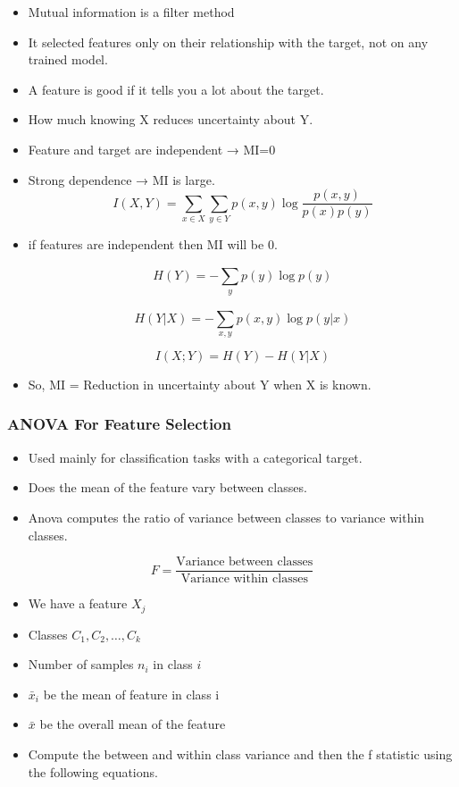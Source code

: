 \documentclass[10pt,a4paper]{article}
\begin{document}
	\begin{itemize}
		\item Mutual information is a filter method
		\item It selected features only on their relationship with the target, not on any trained model.
		\item A feature is good if it tells you a lot about the target.
		\item How much knowing X reduces uncertainty about Y.
		\item Feature and target are independent → MI=0
		\item Strong dependence → MI is large.
		\[
		I(X,Y) = \sum_{x \in X}^{} \sum_{y \in Y}^{} p(x,y) \log \frac{p(x,y)}{p(x)p(y)}
		\]
	
		\item if features are independent then MI will be 0.
		
		\[
		H(Y) = - \sum_{y}^{} p(y) \log p(y)
		\]

		\[
		H(Y|X) = - \sum_{x,y}^{} p(x,y) \log p(y|x)
		\]
		
		\[
		I(X;Y) = H(Y) - H(Y|X)
		\]

		\item So, MI = Reduction in uncertainty about Y when X is known.
	\end{itemize}
	
	\subsubsection{ANOVA For Feature Selection}
	\begin{itemize}
		\item Used mainly for classification tasks with a categorical target.
		\item Does the mean of the feature vary between classes.
		\item Anova computes the ratio of variance between classes to variance within classes.
	\end{itemize}

	$$	F = \frac{\text{Variance between classes}}{\text{Variance within classes}}
	$$
	\begin{itemize}
		\item We have a feature $X_j$
		\item Classes $C_1, C_2, \ldots, C_k$
		\item Number of samples $n_i$ in class $i$
		\item $\bar{x}_i$ be the mean of feature in class i
		\item $\bar{x}$ be the overall mean of the feature
		\item Compute the between and within class variance and then the f statistic using the following equations.
	\end{itemize}
\end{document}
